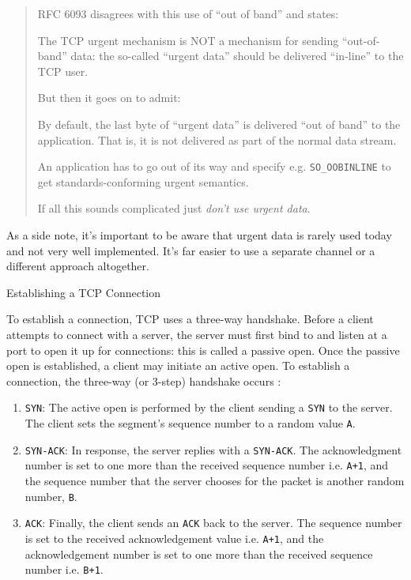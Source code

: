 \begin{description}
\begin{quote}
  RFC 6093 disagrees with this use of ``out of band'' and states:

  The TCP urgent mechanism is NOT a mechanism for sending ``out-of-band'' data: the
  so-called ``urgent data'' should be delivered ``in-line'' to the TCP user.

  But then it goes on to admit:

  By default, the last byte of ``urgent data'' is delivered ``out of band'' to the
  application. That is, it is not delivered as part of the normal data stream.

  An application has to go out of its way and specify e.g. \texttt{SO\_OOBINLINE} to get
  standards-conforming urgent semantics.

  If all this sounds complicated just \emph{don't use urgent data}.
\end{quote}

As a side note, it's important to be aware that urgent data is rarely used today and not
very well implemented. It's far easier to use a separate channel or a different approach
altogether.
\end{description}

\begin{frame}{Establishing a TCP Connection}
  \begin{center}
  \end{center}
  \label{fig:3way}
\end{frame}

To establish a connection, TCP uses a three-way handshake. Before a client attempts to
connect with a server, the server must first bind to and listen at a port to open it up
for connections: this is called a passive open. Once the passive open is established, a
client may initiate an active open. To establish a connection, the three-way (or 3-step)
handshake occurs :
\begin{enumerate}
\item \texttt{SYN}: The active open is performed by the client sending a \texttt{SYN} to
  the server. The client sets the segment's sequence number to a random value \texttt{A}.
\item \texttt{SYN-ACK}: In response, the server replies with a \texttt{SYN-ACK}. The
  acknowledgment number is set to one more than the received sequence number
  i.e. \texttt{A+1}, and the sequence number that the server chooses for the packet is
  another random number, \texttt{B}.
\item \texttt{ACK}: Finally, the client sends an \texttt{ACK} back to the server. The
  sequence number is set to the received acknowledgement value i.e. \texttt{A+1}, and the
  acknowledgement number is set to one more than the received sequence number
  i.e. \texttt{B+1}.
\end{enumerate}

